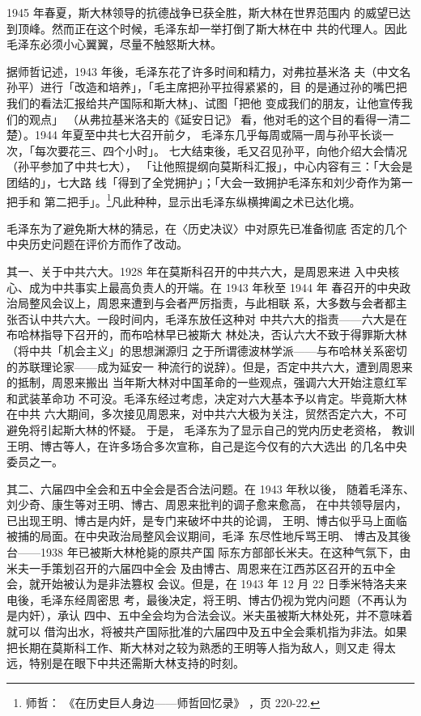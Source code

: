 1945 年春夏，斯大林领导的抗德战争已获全胜，斯大林在世界范围内
的威望已达到顶峰。然而正在这个时候，毛泽东却一举打倒了斯大林在中
共的代理人。因此毛泽东必须小心翼翼，尽量不触怒斯大林。

据师哲记述，1943 年後，毛泽东花了许多时间和精力，对弗拉基米洛
夫（中文名孙平）进行「改造和培养」，「毛主席把孙平拉得紧紧的，目
的是通过孙的嘴巴把我们的看法汇报给共产国际和斯大林」、试图「把他
变成我们的朋友，让他宣传我们的观点」
（从弗拉基米洛夫的《延安日记》
看，他对毛的这个目的看得一清二楚）。1944 年夏至中共七大召开前夕，
毛泽东几乎每周或隔一周与孙平长谈一次，「每次要花三、四个小时」。
七大结束後，毛又召见孙平，向他介绍大会情况（孙平参加了中共七大），
「让他照提纲向莫斯科汇报」，中心内容有三：「大会是团结的」，七大路
线「得到了全党拥护」；「大会一致拥护毛泽东和刘少奇作为第一把手和
第二把手」。\footnote{师哲：
《在历史巨人身边——师哲回忆录》
，页 220-22.}凡此种种，显示出毛泽东纵横捭阖之术已达化境。

毛泽东为了避免斯大林的猜忌，在〈历史决议〉中对原先已准备彻底
否定的几个中央历史问题在评价方而作了改动。

其一、关于中共六大。1928 年在莫斯科召开的中共六大，是周恩来进
入中央核心、成为中共事实上最高负责人的开端。在 1943 年秋至 1944 年
春召开的中央政治局整风会议上，周恩来遭到与会者严厉指责，与此相联
系，大多数与会者都主张否认中共六大。一段时间内，毛泽东放任这种对
中共六大的指责——六大是在布哈林指导下召开的，而布哈林早已被斯大
林处决，否认六大不致于得罪斯大林（将中共「机会主义」的思想渊源归
之于所谓德波林学派——与布哈林关系密切的苏联理论家——成为延安一
种流行的说辞）。但是，否定中共六大，遭到周恩来的抵制，周恩来搬出
当年斯大林对中国革命的一些观点，强调六大开始注意红军和武装革命功
不可没。毛泽东经过考虑，决定对六大基本予以肯定。毕竟斯大林在中共
六大期间，多次接见周恩来，对中共六大极为关注，贸然否定六大，不可
避免将引起斯大林的怀疑。
于是，
毛泽东为了显示自己的党内历史老资格，
教训王明、博古等人，在许多场合多次宣称，自己是迄今仅有的六大选出
的几名中央委员之一。

其二、六届四中全会和五中全会是否合法问题。在 1943 年秋以後，
随着毛泽东、刘少奇、康生等对王明、博古、周恩来批判的调子愈来愈高，
在中共领导层内，已出现王明、博古是内奸，是专门来破坏中共的论调，
王明、博古似乎马上面临被捕的局面。在中央政治局整风会议期间，毛泽
东尽性地斥骂王明、
博古及其後台——1938 年已被斯大林枪毙的原共产国
际东方部部长米夫。在这种气氛下，由米夫一手策划召开的六届四中全会
及由博古、周恩来在江西苏区召开的五中全会，就开始被认为是非法篡权
会议。但是，在 1943 年 12 月 22 日季米特洛夫来电後，毛泽东经周密思
考，最後决定，将王明、博古仍视为党内问题（不再认为是内奸），承认
四中、五中全会均为合法会议。米夫虽被斯大林处死，并不意味着就可以
借沟出水，将被共产国际批准的六届四中及五中全会乘机指为非法。如果
把长期在莫斯科工作、斯大林对之较为熟悉的王明等人指为敌人，则又走
得太远，特别是在眼下中共还需斯大林支持的时刻。

